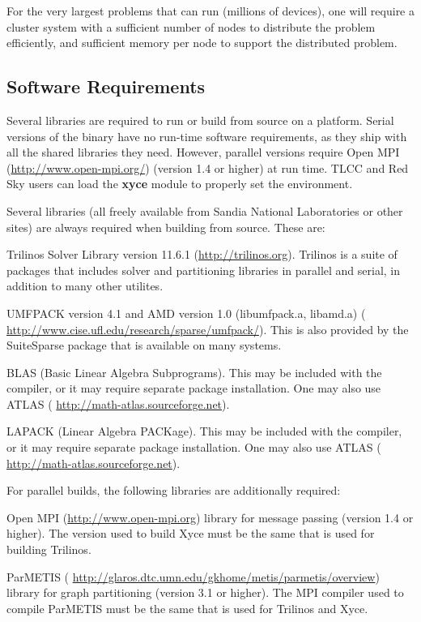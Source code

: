 \documentclass[11pt,report,strict]{SANDreport}
\begin{document}
For the very largest problems that \Xyce{} can run (millions of
devices), one will require a cluster system with a sufficient number
of nodes to distribute the problem efficiently, and sufficient memory
per node to support the distributed problem.  

\subsection{Software Requirements}
Several libraries are required to run \Xyce{} or build \Xyce{} from source on a
platform.  Serial versions of the \Xyce{} binary have no run-time software
requirements, as they ship with all the shared libraries they need.  However,
parallel versions require Open MPI
({\color{XyceDeepRed}\url{http://www.open-mpi.org/}}) (version 1.4 or higher)
at run time.  TLCC and Red Sky users can load the \textbf{xyce} module to properly
set the environment. 

Several libraries (all freely available from Sandia National Laboratories or
other sites) are always required when building \Xyce{} from source.  These are:
\begin{XyceItemize}
\item Trilinos Solver Library version 11.6.1
  ({\color{XyceDeepRed}\url{http://trilinos.org}}).  Trilinos is a suite of
  packages that includes solver and partitioning libraries in parallel and
  serial, in addition to many other utilites.
\item UMFPACK version 4.1 and AMD version 1.0 (libumfpack.a, libamd.a)
  ({\color{XyceDeepRed}
  \url{http://www.cise.ufl.edu/research/sparse/umfpack/}}).  This is also
  provided by the SuiteSparse package that is available on many systems.
\item BLAS (Basic Linear Algebra Subprograms). This may be included with the
  compiler, or it may require separate package installation. One may also use
  ATLAS ({\color{XyceDeepRed} \url{http://math-atlas.sourceforge.net}}).
\item LAPACK (Linear Algebra PACKage). This may be included with the
  compiler, or it may require separate package installation. One may also use
  ATLAS ({\color{XyceDeepRed} \url{http://math-atlas.sourceforge.net}}).
\end{XyceItemize}
For parallel builds, the following libraries are additionally required:
\begin{XyceItemize}
\item Open MPI ({\color{XyceDeepRed}\url{http://www.open-mpi.org}}) library for
  message passing (version 1.4 or higher).  The version used to build Xyce must
  be the same that is used for building Trilinos.
\item ParMETIS ({\color{XyceDeepRed}
  \url{http://glaros.dtc.umn.edu/gkhome/metis/parmetis/overview}}) library for
  graph partitioning (version 3.1 or higher).  The MPI compiler used to compile
  ParMETIS must be the same that is used for Trilinos and Xyce.
\end{XyceItemize}
\end{document}

